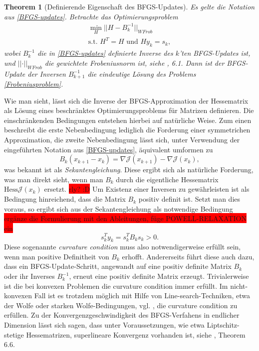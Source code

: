 \documentclass[bibliography=totoc,12pt,a4paper]{scrartcl}
\theoremstyle{exampstyle}
\newtheorem{theorem}[defi]{Theorem}
\numberwithin{equation}{section}
\begin{document}
\begin{theorem}[Definierende Eigenschaft des BFGS-Updates]
		
	Es gelte die Notation aus \ref{BFGS-updates}. Betrachte das Optimierungsproblem
	\begin{equation}\label{Frobeniusproblem}
	\begin{aligned}
		\underset{H}{\min} \vert\vert H - B_k^{-1} \vert\vert _{WFrob} \\
		\text{s.t. } H^T = H \text{ und } H y_k = s_k,
	\end{aligned}
	\end{equation}
	wobei $B_k^{-1}$ die in \ref{BFGS-updates} definierte Inverse des $k$'ten BFGS-Updates ist, und $\vert\vert \cdot \vert\vert_{WFrob}$ die gewichtete Frobeniusnorm ist, siehe \cite{Nocedal}, 6.1. Dann ist der BFGS-Update der Inversen $B_{k+1}^{-1}$ die eindeutige Lösung des Problems \ref{Frobeniusproblem}.
\end{theorem}
Wie man sieht, lässt sich die Inverse der BFGS-Approximation der Hessematrix als Lösung eines beschränktes Optimierungsproblems für Matrizen definieren. Die einschränkenden Bedingungen entstehen hierbei auf natürliche Weise. Zum einen beschreibt die erste Nebenbedingung lediglich die Forderung einer symmetrichen Approximation, die zweite Nebenbedingung lässt sich, unter Verwendung der eingeführten Notation aus \ref{BFGS-updates}, äquivalent umformen zu
\begin{equation}
	B_k (x_{k+1} - x_k) = \nabla \mathcal{J}(x_{k+1}) - \nabla \mathcal{J}(x_k),
\end{equation}
was bekannt ist als \textit{Sekantengleichung}. Diese ergibt sich als natürliche Forderung, was man direkt sieht, wenn man $B_k$ durch die eigentliche Hessematrix $\text{Hess}\mathcal{J}(x_k)$ ersetzt. \colorbox{red}{rly? :D} Um Existenz einer Inversen zu gewährleisten ist als Bedingung hinreichend, dass die Matrix $B_k$ positiv definit ist. Setzt man dies voraus, so ergibt sich aus der Sekantengleichung als notwendige Bedingung
\colorbox{red}{ ergänze die Formulierung mit den Ableitungen, füge POWELL-RELAXATION ein}
\begin{equation}
	s_k^T y_k = s_k^T B_k s_k > 0.
\end{equation}
Diese sogenannte \textit{curvature condition} muss also notwendigerweise erfüllt sein, wenn man positive Definitheit von $B_k$ erhofft. Andererseits führt diese auch dazu, dass ein BFGS-Update-Schritt, angewandt auf eine positiv definite Matrix $B_k$ oder ihr Inverses $B_k^{-1}$, erneut eine positiv definite Matrix erzeugt. Trivialerweise ist die bei konvexen Problemen die curvature condition immer erfüllt. Im nicht-konvexen Fall ist es trotzdem möglich mit Hilfe von Line-search-Techniken, etwa der Wolfe oder starken Wolfe-Bedingungen, vgl. \cite{Nocedal}, die curvature condition zu erfüllen. Zu der Konvergenzgeschwindigkeit des BFGS-Verfahens in endlicher Dimension lässt sich sagen, dass unter Voraussetzungen, wie etwa Liptschitz-stetige Hessematrizen, superlineare Konvergenz vorhanden ist, siehe \cite{Nocedal}, Theorem 6.6.
\end{document}
